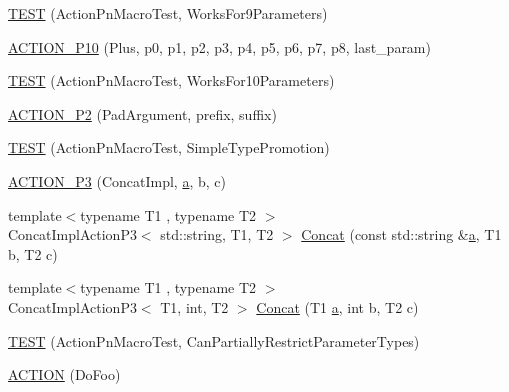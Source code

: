 \begin{DoxyCompactItemize}
\item 
\hyperlink{namespacetesting_1_1gmock__generated__actions__test_a52d6dc447a4a71524adfeb7c8f7b6a68}{T\+E\+ST} (Action\+Pn\+Macro\+Test, Works\+For9\+Parameters)
\item 
\hyperlink{namespacetesting_1_1gmock__generated__actions__test_a3c6e7ef6aefc94efc9e815e92f0b3e47}{A\+C\+T\+I\+O\+N\+\_\+\+P10} (Plus, p0, p1, p2, p3, p4, p5, p6, p7, p8, last\+\_\+param)
\item 
\hyperlink{namespacetesting_1_1gmock__generated__actions__test_a564fd77344f58b26577452a380c93935}{T\+E\+ST} (Action\+Pn\+Macro\+Test, Works\+For10\+Parameters)
\item 
\hyperlink{namespacetesting_1_1gmock__generated__actions__test_ad58030fe83ad47cdb4ff027f8399adb4}{A\+C\+T\+I\+O\+N\+\_\+\+P2} (Pad\+Argument, prefix, suffix)
\item 
\hyperlink{namespacetesting_1_1gmock__generated__actions__test_ad42236ad6c6d01fad6dd947ca6163d59}{T\+E\+ST} (Action\+Pn\+Macro\+Test, Simple\+Type\+Promotion)
\item 
\hyperlink{namespacetesting_1_1gmock__generated__actions__test_ae46434959151b83249e52d4869e28cf0}{A\+C\+T\+I\+O\+N\+\_\+\+P3} (Concat\+Impl, \hyperlink{_07copy_08_2_read_camera_model_8m_a551a3d351eadcc0b9b1a2f24f0fb5ea0}{a}, b, c)
\item 
{\footnotesize template$<$typename T1 , typename T2 $>$ }\\Concat\+Impl\+Action\+P3$<$ std\+::string, T1, T2 $>$ \hyperlink{namespacetesting_1_1gmock__generated__actions__test_a28213583d5450876b564a3df58d1cf91}{Concat} (const std\+::string \&\hyperlink{_07copy_08_2_read_camera_model_8m_a551a3d351eadcc0b9b1a2f24f0fb5ea0}{a}, T1 b, T2 c)
\item 
{\footnotesize template$<$typename T1 , typename T2 $>$ }\\Concat\+Impl\+Action\+P3$<$ T1, int, T2 $>$ \hyperlink{namespacetesting_1_1gmock__generated__actions__test_a861e9fadbecf0c66e8226021c6c22013}{Concat} (T1 \hyperlink{_07copy_08_2_read_camera_model_8m_a551a3d351eadcc0b9b1a2f24f0fb5ea0}{a}, int b, T2 c)
\item 
\hyperlink{namespacetesting_1_1gmock__generated__actions__test_a7222610b197216e7976b3fa751f97daf}{T\+E\+ST} (Action\+Pn\+Macro\+Test, Can\+Partially\+Restrict\+Parameter\+Types)
\item 
\hyperlink{namespacetesting_1_1gmock__generated__actions__test_a183b3863b3c2319ac414fe694455f58c}{A\+C\+T\+I\+ON} (Do\+Foo)
\item 

\end{DoxyCompactItemize}

